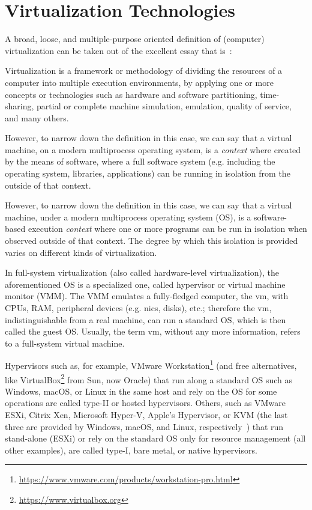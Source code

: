 \section{Virtualization Technologies}
\label{sec:leavingvirtualization}

A broad, loose, and multiple-purpose oriented definition of (computer) virtualization can be taken out of the excellent essay that is~\cite{introvirtualization}:
\begin{displayquote}
Virtualization is a framework or methodology of dividing the resources of a computer into multiple execution environments, by applying one or more concepts or technologies such as hardware and software partitioning, time-sharing, partial or complete machine simulation, emulation, quality of service, and many others.
\end{displayquote}

However, to narrow down the definition in this case, we can say that a virtual machine, on a modern multiprocess operating system, is a \emph{context} where created by the means of software, where a full software system (e.g. including the operating system, libraries, applications\textellipsis) can be running in isolation from the outside of that context.

However, to narrow down the definition in this case, we can say that a virtual machine, under  a modern multiprocess operating system (OS), is a software-based execution \emph{context} where one or more programs can be run in isolation when observed outside of that context.
The degree by which this isolation is provided varies on different kinds of virtualization.

In full-system virtualization (also called hardware-level virtualization), the aforementioned OS is a specialized one, called hypervisor or virtual machine monitor (VMM).
The VMM emulates a fully-fledged computer, the \gls{vm}, with CPUs, RAM, peripheral devices (e.g. \glspl{nic}, disks), etc.; therefore the \gls{vm}, indistinguishable from a real machine, can run a standard OS, which is then called the guest OS.
Usually, the term \gls{vm}, without any more information, refers to a full-system virtual machine.

Hypervisors such as, for example, VMware Workstation\footnote{\url{https://www.vmware.com/products/workstation-pro.html}} (and free alternatives, like VirtualBox\footnote{\url{https://www.virtualbox.org}} from Sun, now Oracle) that run along a standard OS such as Windows, macOS, or Linux in the same host and rely on the OS for some operations are called type-II or hosted hypervisors.
Others, such as VMware ESXi, Citrix Xen, Microsoft Hyper-V, Apple's Hypervisor, or KVM (the last three are provided by Windows, macOS, and Linux, respectively~\cite{whatiskvm,applehypervisor,hyperv}) that run stand-alone (ESXi) or rely on the standard OS only for resource management (all other examples), are called type-I, bare metal, or native hypervisors.

